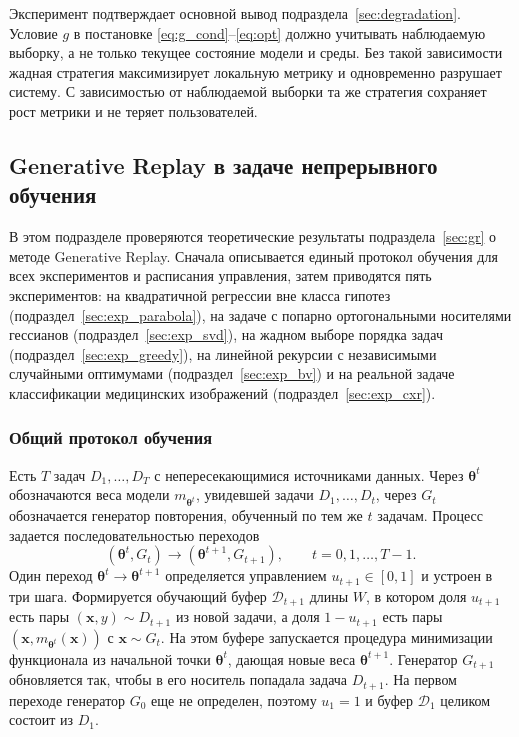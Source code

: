 \documentclass[a4paper,14pt,oneside,openany]{extarticle}
\newcommand{\bx}{\mathbf{x}}
\newcommand{\cD}{\mathcal{D}}
\newcommand{\btheta}{\boldsymbol{\theta}}
\begin{document}
Эксперимент подтверждает основной вывод подраздела~\ref{sec:degradation}. Условие $g$ в постановке \eqref{eq:g_cond}--\eqref{eq:opt} должно учитывать наблюдаемую выборку, а не только текущее состояние модели и среды. Без такой зависимости жадная стратегия максимизирует локальную метрику и одновременно разрушает систему. С зависимостью от наблюдаемой выборки та же стратегия сохраняет рост метрики и не теряет пользователей.

\subsection{Generative Replay в задаче непрерывного обучения}\label{sec:exp_gr}

В этом подразделе проверяются теоретические результаты подраздела~\ref{sec:gr} о методе Generative Replay. Сначала описывается единый протокол обучения для всех экспериментов и расписания управления, затем приводятся пять экспериментов: на квадратичной регрессии вне класса гипотез (подраздел~\ref{sec:exp_parabola}), на задаче с попарно ортогональными носителями гессианов (подраздел~\ref{sec:exp_svd}), на жадном выборе порядка задач (подраздел~\ref{sec:exp_greedy}), на линейной рекурсии с независимыми случайными оптимумами (подраздел~\ref{sec:exp_bv}) и на реальной задаче классификации медицинских изображений (подраздел~\ref{sec:exp_cxr}).

\subsubsection{Общий протокол обучения}\label{sec:exp_gr_setup}

Есть $T$ задач $D_1, \ldots, D_T$ с непересекающимися источниками данных. Через $\btheta^t$ обозначаются веса модели $m_{\btheta^t}$, увидевшей задачи $D_1, \ldots, D_t$, через $G_t$ обозначается генератор повторения, обученный по тем же $t$ задачам. Процесс задается последовательностью переходов
\[
    (\btheta^t, G_t) \longrightarrow (\btheta^{t+1}, G_{t+1}), \qquad t = 0, 1, \ldots, T-1.
\]
Один переход $\btheta^t \to \btheta^{t+1}$ определяется управлением $u_{t+1} \in [0, 1]$ и устроен в три шага. Формируется обучающий буфер $\cD_{t+1}$ длины $W$, в котором доля $u_{t+1}$ есть пары $(\bx, y) \sim D_{t+1}$ из новой задачи, а доля $1 - u_{t+1}$ есть пары $(\bx, m_{\btheta^t}(\bx))$ с $\bx \sim G_t$. На этом буфере запускается процедура минимизации функционала из начальной точки $\btheta^t$, дающая новые веса $\btheta^{t+1}$. Генератор $G_{t+1}$ обновляется так, чтобы в его носитель попадала задача $D_{t+1}$. На первом переходе генератор $G_0$ еще не определен, поэтому $u_1 = 1$ и буфер $\cD_1$ целиком состоит из $D_1$.
\end{document}
